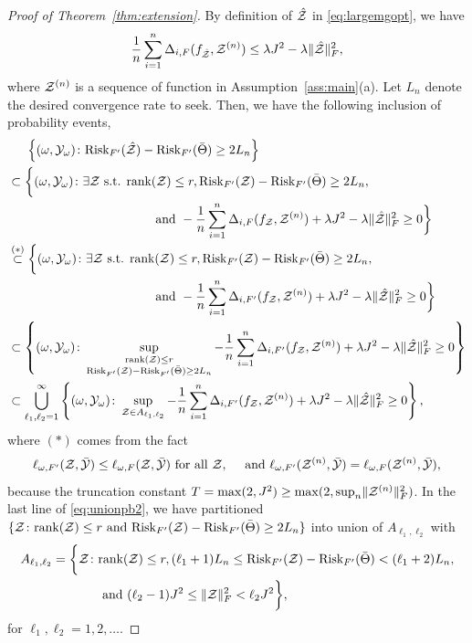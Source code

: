 \documentclass[11pt]{article}
\theoremstyle{plain}
\theoremstyle{definition}
\def\risk{\textup{Risk}}
\begin{document}
\begin{proof}[Proof of Theorem~\ref{thm:extension}]
By definition of $\hat {\mathcal{Z}}$ in \eqref{eq:largemgopt}, we have 
\[ \frac{1}{n}\sum_{i=1}^n \Delta_{i,F}(f_{\hat {\mathcal{Z}}},\mathcal{Z}^{(n)})\leq \lambda J^2-\lambda\lVert\hat{\mathcal{Z}}\rVert_F^2,\] where $\mathcal{Z}^{(n)}$ is a sequence of function in Assumption~\ref{ass:main}(a).
Let $L_n$ denote the desired convergence rate to seek.  Then, we have the following inclusion of probability events,
\begin{align}\label{eq:unionpb2}
&\hspace{.5cm}\left\{(\omega,\tY_{\omega})\colon \risk_{F'}(\hat \tZ)-\risk_{F'}(\bar\Theta)\geq 2L_n \right\}\nonumber\\
&\subset\bigg\{(\omega,\tY_{\omega})\colon\exists \tZ \text{ s.t. } \text{rank}(\tZ)\leq r,  \risk_{F'}(\tZ)-\risk_{F'}(\bar\Theta)\geq2 L_n,\nonumber
\\& \hspace{4cm}\text{ and } -\frac{1}{n}\sum_{i=1}^n\Delta_{i,F}(f_\tZ,\tZ^{(n)})+\lambda J^2-\lambda\FnormSize{}{\hat\tZ}^2\geq 0 \bigg\}\nonumber\\
&\stackrel{(*)}{\subset}\bigg\{(\omega,\tY_{\omega})\colon\exists \tZ \text{ s.t. } \text{rank}(\tZ)\leq r,  \risk_{F'}(\tZ)-\risk_{F'}(\bar\Theta)\geq2 L_n,\nonumber
\\& \hspace{4cm}\text{ and } -\frac{1}{n}\sum_{i=1}^n\Delta_{i,F'}(f_\tZ,\tZ^{(n)})+\lambda J^2-\lambda\FnormSize{}{\hat\tZ}^2\geq 0 \bigg\}\nonumber\\
&\subset \left\{(\omega,\tY_{\omega})\colon\sup_{\substack{\text{rank}(\tZ)\leq r\\  
\risk_{F'}(\tZ)-\risk_{F'}(\bar\Theta)\geq 2L_n  }}-\frac{1}{n}\sum_{i=1}^n\Delta_{i,F'}(f_\tZ,\tZ^{(n)})+\lambda J^2-\lambda\FnormSize{}{\hat\tZ}^2\geq 0\right\}\nonumber\\
&\subset \bigcup_{\ell_1,\ell_2=1}^{\infty}\left\{(\omega,\tY_\omega)\colon \sup_{\tZ\in A_{\ell_1,\ell_2}}-\frac{1}{n}\sum_{i=1}^n\Delta_{i,F'}(f_\tZ,\tZ^{(n)})+\lambda J^2-\lambda\FnormSize{}{\hat\tZ}^2\geq 0\right\},
\end{align}
where  $(*)$ comes from the fact
 \begin{align}
 \ell_{\omega,F'}(\mathcal{Z},\bar{\mathcal{Y}})\leq \ell_{\omega,F}(\mathcal{Z},\bar{\mathcal{Y}}) \text{ for all } \mathcal{Z},\quad  \text{ and }   \ell_{\omega,F'}(\mathcal{Z}^{(n)},\bar{\mathcal{Y}})= \ell_{\omega,F}(\mathcal{Z}^{(n)},\bar{\mathcal{Y}}), 
 \end{align}
 because the truncation constant $T = \max(2,J^2)\geq \max(2,\sup_n\lVert\mathcal{Z}^{(n)}\rVert_F^2)$.
In the last line of \eqref{eq:unionpb2}, we have partitioned $\{\tZ\colon \text{rank}(\tZ)\leq r \text{ and } \risk_{F'}(\tZ)-\risk_{F'}(\bar\Theta)\geq 2L_n\}$ into union of $A_{\ell_1,\ell_2}$ with 
\begin{align}
A_{\ell_1,\ell_2} = \bigg\{\tZ\colon &\text{rank}(\tZ)\leq r, (\ell_1+1) L_n\leq  \risk_{F'}(\tZ)-\risk_{F'}(\bar\Theta)<(\ell_1+2)L_n,\\
&\text{ and } (\ell_2-1)J^2\leq \FnormSize{}{\tZ}^2<\ell_2 J^2\bigg\},
\end{align}
for $\ell_1,\ell_2 = 1,2,\ldots$. 



\end{proof}
\end{document}
